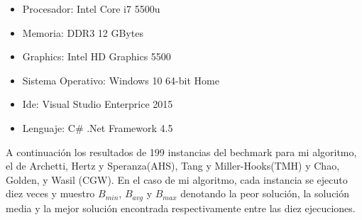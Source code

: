 \begin{itemize}
  \item Procesador: Intel Core i7 5500u
  \item Memoria: DDR3 12 GBytes
  \item Graphics: Intel HD Graphics 5500
  \item Sistema Operativo: Windows 10 64-bit Home
  \item Ide: Visual Studio Enterprice 2015
  \item Lenguaje: C\# .Net Framework 4.5
\end{itemize}

\bigskip

A continuación los resultados de 199 instancias del bechmark para mi algoritmo, el de Archetti, Hertz y Speranza(AHS), Tang y Miller-Hooks(TMH) y Chao, Golden, y Wasil (CGW). En el caso de mi algoritmo, cada instancia se ejecuto diez veces y muestro $B_{min}$, $B_{avg}$ y $B_{max}$ denotando la peor solución, la solución media y la mejor solución encontrada respectivamente entre las diez ejecuciones.



